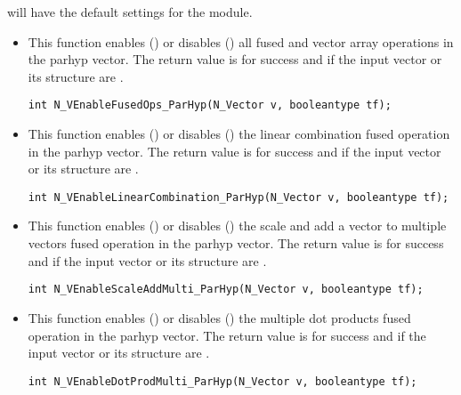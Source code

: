  will have the default settings for the {\nvecph} module.
\begin{itemize}


\item {}

This function enables () or disables () all fused and
vector array operations in the parhyp vector. The return value is  for
success and  if the input vector or its  structure are .

\verb|int N_VEnableFusedOps_ParHyp(N_Vector v, booleantype tf);|


\item {}

This function enables () or disables () the linear
combination fused operation in the parhyp vector. The return value is  for
success and  if the input vector or its  structure are .

\verb|int N_VEnableLinearCombination_ParHyp(N_Vector v, booleantype tf);|


\item {}

This function enables () or disables () the scale and
add a vector to multiple vectors fused operation in the parhyp vector. The
return value is  for success and  if the input vector or its
 structure are .

\verb|int N_VEnableScaleAddMulti_ParHyp(N_Vector v, booleantype tf);|


\item {}

This function enables () or disables () the multiple
dot products fused operation in the parhyp vector. The return value is 
for success and  if the input vector or its  structure are
.

\verb|int N_VEnableDotProdMulti_ParHyp(N_Vector v, booleantype tf);|



\end{itemize}

